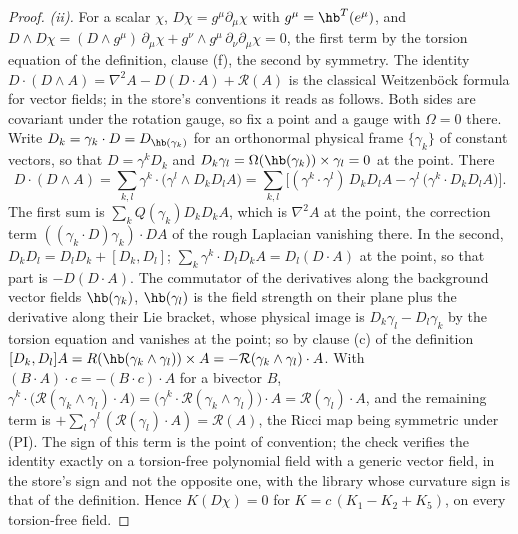 \begin{proof}
\emph{(ii).} For a scalar $\chi$, $D\chi = g^{\mu}\partial_{\mu}\chi$ with $g^{\mu} = \hb^{T}(e^{\mu})$, and $D\wedge D\chi = (D\wedge g^{\mu})\,\partial_{\mu}\chi + g^{\nu}\wedge g^{\mu}\,\partial_{\nu}\partial_{\mu}\chi = 0$, the first term by the torsion equation of the definition, clause (f), the second by symmetry. The identity $D\cdot(D\wedge A) = \nabla^{2}A - D(D\cdot A) + \mathcal{R}(A)$ is the classical Weitzenb\"ock formula for vector fields; in the store's conventions it reads as follows. Both sides are covariant under the rotation gauge, so fix a point and a gauge with $\Omega = 0$ there. Write $D_{k} = \gamma_{k}\cdot D = D_{\hb(\gamma_{k})}$ for an orthonormal physical frame $\{\gamma_{k}\}$ of constant vectors, so that $D = \gamma^{k}D_{k}$ and $D_{k}\gamma_{l} = \Omega(\hb(\gamma_{k}))\times\gamma_{l} = 0$ at the point. There
\[
D\cdot(D\wedge A) = \sum_{k,l}\gamma^{k}\cdot\bigl(\gamma^{l}\wedge D_{k}D_{l}A\bigr) = \sum_{k,l}\bigl[(\gamma^{k}\cdot\gamma^{l})\,D_{k}D_{l}A - \gamma^{l}\,\bigl(\gamma^{k}\cdot D_{k}D_{l}A\bigr)\bigr] .
\]
The first sum is $\sum_{k}Q(\gamma_{k})D_{k}D_{k}A$, which is $\nabla^{2}A$ at the point, the correction term $((\gamma_{k}\cdot D)\gamma_{k})\cdot D A$ of the rough Laplacian vanishing there. In the second, $D_{k}D_{l} = D_{l}D_{k} + [D_{k}, D_{l}]$; $\sum_{k}\gamma^{k}\cdot D_{l}D_{k}A = D_{l}(D\cdot A)$ at the point, so that part is $-D(D\cdot A)$. The commutator of the derivatives along the background vector fields $\hb(\gamma_{k})$, $\hb(\gamma_{l})$ is the field strength on their plane plus the derivative along their Lie bracket, whose physical image is $D_{k}\gamma_{l} - D_{l}\gamma_{k}$ by the torsion equation and vanishes at the point; so by clause (c) of the definition $[D_{k}, D_{l}]A = R(\hb(\gamma_{k}\wedge\gamma_{l}))\times A = -\mathcal{R}(\gamma_{k}\wedge\gamma_{l})\cdot A$. With $(B\cdot A)\cdot c = -(B\cdot c)\cdot A$ for a bivector $B$, $\gamma^{k}\cdot\bigl(\mathcal{R}(\gamma_{k}\wedge\gamma_{l})\cdot A\bigr) = \bigl(\gamma^{k}\cdot\mathcal{R}(\gamma_{k}\wedge\gamma_{l})\bigr)\cdot A = \mathcal{R}(\gamma_{l})\cdot A$, and the remaining term is $+\sum_{l}\gamma^{l}\,(\mathcal{R}(\gamma_{l})\cdot A) = \mathcal{R}(A)$, the Ricci map being symmetric under (PI). The sign of this term is the point of convention; the check verifies the identity exactly on a torsion-free polynomial field with a generic vector field, in the store's sign and not the opposite one, with the library whose curvature sign is that of the definition. Hence $K(D\chi) = 0$ for $K = c\,(K_{1} - K_{2} + K_{5})$, on every torsion-free field.


\end{proof}
